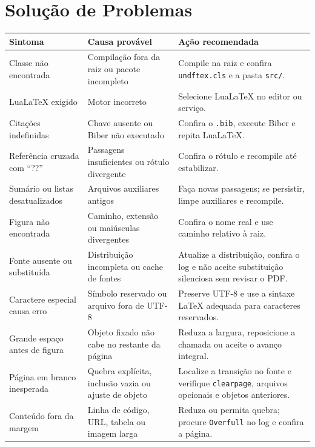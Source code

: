 \chapter{Solução de Problemas}

\begin{longtable}{>{\raggedright\arraybackslash}p{} >{\raggedright\arraybackslash}p{} >{\raggedright\arraybackslash}p{}}
\toprule
\textbf{Sintoma} & \textbf{Causa provável} & \textbf{Ação recomendada} \\
\midrule
\endhead
Classe não encontrada & Compilação fora da raiz ou pacote incompleto & Compile na raiz e confira \texttt{undftex.cls} e a pasta \texttt{src/}. \\
\addlinespace
LuaLaTeX exigido & Motor incorreto & Selecione LuaLaTeX no editor ou serviço. \\
\addlinespace
Citações indefinidas & Chave ausente ou Biber não executado & Confira o \texttt{.bib}, execute Biber e repita LuaLaTeX. \\
\addlinespace
Referência cruzada com ``??'' & Passagens insuficientes ou rótulo divergente & Confira o rótulo e recompile até estabilizar. \\
\addlinespace
Sumário ou listas desatualizados & Arquivos auxiliares antigos & Faça novas passagens; se persistir, limpe auxiliares e recompile. \\
\addlinespace
Figura não encontrada & Caminho, extensão ou maiúsculas divergentes & Confira o nome real e use caminho relativo à raiz. \\
\addlinespace
Fonte ausente ou substituída & Distribuição incompleta ou cache de fontes & Atualize a distribuição, confira o log e não aceite substituição silenciosa sem revisar o PDF. \\
\addlinespace
Caractere especial causa erro & Símbolo reservado ou arquivo fora de UTF-8 & Preserve UTF-8 e use a sintaxe LaTeX adequada para caracteres reservados. \\
\addlinespace
Grande espaço antes de figura & Objeto fixado não cabe no restante da página & Reduza a largura, reposicione a chamada ou aceite o avanço integral. \\
\addlinespace
Página em branco inesperada & Quebra explícita, inclusão vazia ou ajuste de objeto & Localize a transição no fonte e verifique \texttt{clearpage}, arquivos opcionais e objetos anteriores. \\
\addlinespace
Conteúdo fora da margem & Linha de código, URL, tabela ou imagem larga & Reduza ou permita quebra; procure \texttt{Overfull} no log e confira a página. \\

\end{longtable}
